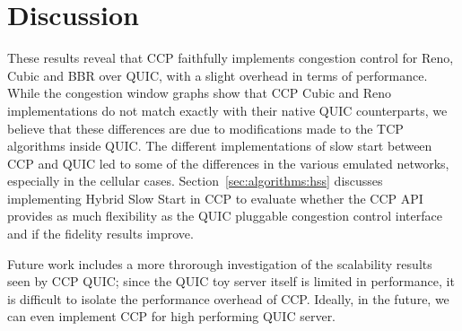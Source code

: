 \section{Discussion}
\label{sec:performance:discussion}
These results reveal that CCP faithfully implements congestion control for Reno, Cubic and BBR over QUIC, with a slight overhead in terms of performance.
While the congestion window graphs show that CCP Cubic and Reno implementations do not match exactly with their native QUIC counterparts, we believe that these differences are due to modifications made to the TCP algorithms inside QUIC.
The different implementations of slow start between CCP and QUIC led to some of the differences in the various emulated networks, especially in the cellular cases.
Section~\ref{sec:algorithms:hss} discusses implementing Hybrid Slow Start in CCP to evaluate whether the CCP API provides as much flexibility as the QUIC pluggable congestion control interface and if the fidelity results improve.

Future work includes a more throrough investigation of the scalability results seen by CCP QUIC; since the QUIC toy server itself is limited in performance, it is difficult to isolate the performance overhead of CCP.
Ideally, in the future, we can even implement CCP for high performing QUIC server.



